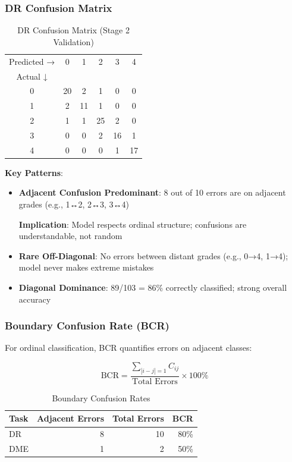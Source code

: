 \documentclass[12pt,a4paper]{article}
\begin{document}
\subsubsection{DR Confusion Matrix}

\begin{table}[H]
\centering
\small
\caption{DR Confusion Matrix (Stage 2 Validation)}
\begin{tabular}{|c|ccccc|}
\hline
Predicted → & 0 & 1 & 2 & 3 & 4 \\
Actual ↓ & & & & & \\
\hline
0 & 20 & 2 & 1 & 0 & 0 \\
1 & 2 & 11 & 1 & 0 & 0 \\
2 & 1 & 1 & 25 & 2 & 0 \\
3 & 0 & 0 & 2 & 16 & 1 \\
4 & 0 & 0 & 0 & 1 & 17 \\
\hline
\end{tabular}
\end{table}

\textbf{Key Patterns}:

\begin{itemize}
    \item \textbf{Adjacent Confusion Predominant}: 8 out of 10 errors are on adjacent grades (e.g., 1↔2, 2↔3, 3↔4)
    
    \textbf{Implication}: Model respects ordinal structure; confusions are understandable, not random
    
    \item \textbf{Rare Off-Diagonal}: No errors between distant grades (e.g., 0→4, 1→4); model never makes extreme mistakes
    
    \item \textbf{Diagonal Dominance}: 89/103 = 86\% correctly classified; strong overall accuracy
\end{itemize}

\subsubsection{Boundary Confusion Rate (BCR)}

For ordinal classification, BCR quantifies errors on adjacent classes:

\begin{equation}
\text{BCR} = \frac{\sum_{|i-j|=1} C_{ij}}{\text{Total Errors}} \times 100\%
\end{equation}

\begin{table}[H]
\centering
\small
\caption{Boundary Confusion Rates}
\begin{tabular}{|l|r|r|r|}
\hline
\textbf{Task} & \textbf{Adjacent Errors} & \textbf{Total Errors} & \textbf{BCR} \\
\hline
DR & 8 & 10 & 80\% \\
DME & 1 & 2 & 50\% \\
\hline
\end{tabular}
\end{table}
\end{document}

